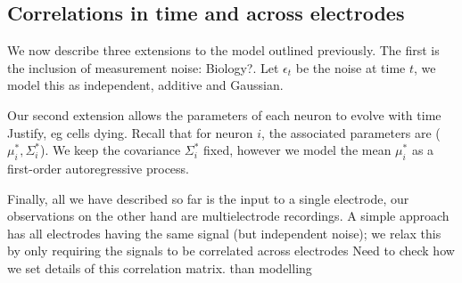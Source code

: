 \subsection{Correlations in time and across electrodes}
We now describe three extensions to the model outlined previously. The first is the inclusion of measurement noise: 
{\color{red} Biology?}. Let $\epsilon_t$ be the noise at time $t$, we model this as independent, additive and Gaussian.

Our second extension allows the parameters of each neuron to evolve with time {\color{red} Justify, eg cells dying}. Recall that for neuron $i$, the 
associated parameters are ($\mu^*_i, \Sigma^*_i$). We keep the covariance $\Sigma^*_i$ fixed, however we model the mean $\mu^*_i$ as a first-order
autoregressive process. 

Finally, all we have described so far is the input to a single electrode, our observations on the other hand are multielectrode recordings. 
A simple approach has all electrodes having the same signal (but independent noise); we relax this by only requiring the signals to be
correlated across electrodes {\color{red} Need to check how we set details of this correlation matrix}.
than modelling
